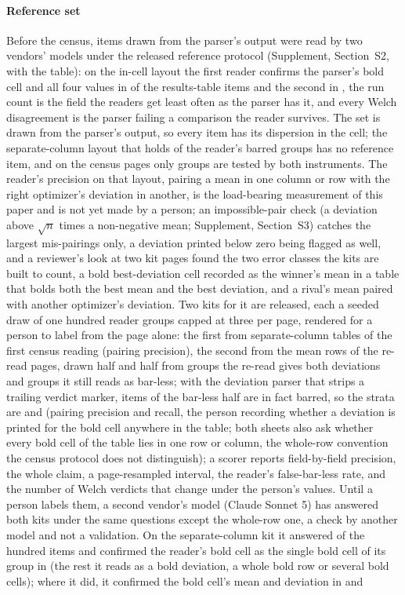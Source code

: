 \documentclass[preprint,review,12pt]{elsarticle}
\begin{document}
\paragraph{Reference set} Before the census, \nGItemsN{} items drawn from the parser's output were read by two vendors' models under the released reference protocol (Supplement, Section~S2, with the table): on the in-cell layout the first reader confirms the parser's bold cell and all four values in \nGClaimFrac{} of the results-table items and the second in \nGTwoClaimFrac{}, the run count is the field the readers get least often as the parser has it, and every Welch disagreement is the parser failing a comparison the reader survives. The set is drawn from the parser's output, so every item has its dispersion in the cell; the separate-column layout that holds \nCrcBarredGroupsSeparateLayoutPct{} of the reader's barred groups has no reference item, and on the census pages only \nCzShared{} groups are tested by both instruments. The reader's precision on that layout, pairing a mean in one column or row with the right optimizer's deviation in another, is the load-bearing measurement of this paper and is not yet made by a person; an impossible-pair check (a deviation above $\sqrt{n}$ times a non-negative mean; Supplement, Section~S3) catches the largest mis-pairings only, a deviation printed below zero being flagged as well, and a reviewer's look at two kit pages found the two error classes the kits are built to count, a bold best-deviation cell recorded as the winner's mean in a table that bolds both the best mean and the best deviation, and a rival's mean paired with another optimizer's deviation. Two kits for it are released, each a seeded draw of one hundred reader groups capped at three per page, rendered for a person to label from the page alone: the first from separate-column tables of the first census reading (pairing precision), the second from the mean rows of the re-read pages, drawn half and half from groups the re-read gives both deviations and groups it still reads as bar-less; with the deviation parser that strips a trailing verdict marker, \nHrkRestrataChanged{} items of the bar-less half are in fact barred, so the strata are \nHrkBarred{} and \nHrkBarless{} (pairing precision and recall, the person recording whether a deviation is printed for the bold cell anywhere in the table; both sheets also ask whether every bold cell of the table lies in one row or column, the whole-row convention the census protocol does not distinguish); a scorer reports field-by-field precision, the whole claim, a page-resampled interval, the reader's false-bar-less rate, and the number of Welch verdicts that change under the person's values. Until a person labels them, a second vendor's model (Claude Sonnet 5) has answered both kits under the same questions except the whole-row one, a check by another model and not a validation. On the separate-column kit it answered \nHmsLabelled{} of the hundred items and confirmed the reader's bold cell as the single bold cell of its group in \nHmsBoldOkFrac{} (the rest it reads as a bold deviation, a whole bold row or several bold cells); where it did, it confirmed the bold cell's mean and deviation in \nHmsWinnerMeanFrac{} and 
\end{document}
